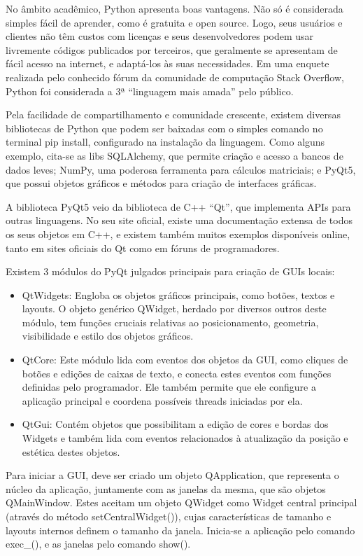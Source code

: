 No âmbito acadêmico, Python apresenta boas vantagens. Não só é considerada simples fácil de aprender, como é gratuita e open source. Logo, seus usuários e clientes não têm custos com licenças e seus desenvolvedores podem usar livremente códigos publicados por terceiros, que geralmente se apresentam de fácil acesso na internet, e adaptá-los às suas necessidades. Em uma enquete realizada pelo conhecido fórum da comunidade de computação Stack Overflow, Python foi considerada a 3ª “linguagem mais amada” pelo público.

Pela facilidade de compartilhamento e comunidade crescente, existem diversas bibliotecas de Python que podem ser baixadas com o simples comando no terminal pip install, configurado na instalação da linguagem. Como alguns exemplo, cita-se as libs SQLAlchemy, que permite criação e acesso a bancos de dados leves; NumPy, uma poderosa ferramenta para cálculos matriciais; e PyQt5, que possui objetos gráficos e métodos para criação de interfaces gráficas.

A biblioteca PyQt5 veio da biblioteca de C++ “Qt”, que implementa APIs para outras linguagens. No seu site oficial, existe uma documentação extensa de todos os seus objetos em C++, e existem também muitos exemplos disponíveis online, tanto em sites oficiais do Qt como em fóruns de programadores.

Existem 3 módulos do PyQt julgados principais para criação de GUIs locais:

\begin{itemize}
	\item QtWidgets: Engloba os objetos gráficos principais, como botões, textos e layouts. O objeto genérico QWidget, herdado por diversos outros deste módulo, tem funções cruciais relativas ao posicionamento, geometria, visibilidade e estilo dos objetos gráficos.
	\item QtCore: Este módulo lida com eventos dos objetos da GUI, como cliques de botões e edições de caixas de texto, e conecta estes eventos com funções definidas pelo programador. Ele também permite que ele configure a aplicação principal e coordena possíveis threads iniciadas por ela.
	\item QtGui: Contém objetos que possibilitam a edição de cores e bordas dos Widgets e também lida com eventos relacionados à atualização da posição e estética destes objetos.
\end{itemize}

Para iniciar a GUI, deve ser criado um objeto QApplication, que representa o núcleo da aplicação, juntamente com as janelas da mesma, que são objetos QMainWindow. Estes aceitam um objeto QWidget como Widget central principal (através do método setCentralWidget()), cujas características de tamanho e layouts internos definem o tamanho da janela. Inicia-se a aplicação pelo comando exec_(), e as janelas pelo comando show().

